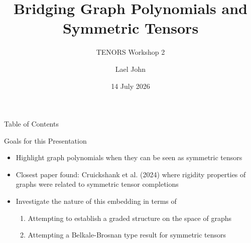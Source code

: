 \documentclass{beamer}
\date{14 July 2026}
\author{Lael John}
\title[Graph Polynomials and Symmetric Tensors]{Bridging Graph Polynomials and Symmetric Tensors}
\subtitle{TENORS Workshop 2}
\institute{KU Leuven}
\begin{document}
\maketitle
\addtocounter{framenumber}{-1}
\begin{frame}{Table of Contents}
    \tableofcontents
\end{frame}
\begin{frame}{Goals for this Presentation}
    \begin{itemize}
        \item<1-> Highlight graph polynomials when they can be seen as symmetric tensors
        \item<2-> Closest paper found: Cruickshank et al. (2024) \cite{cruickshank_global_2023} where rigidity properties of graphs were related to symmetric tensor completions
        \item<3-> Investigate the nature of this embedding in terms of \begin{enumerate}
            \item<3-> Attempting to establish a graded structure on the space of graphs
            \item<4-> Attempting a Belkale-Brosnan type result for symmetric tensors
        \end{enumerate}
    \end{itemize}
\end{frame}
\end{document}
